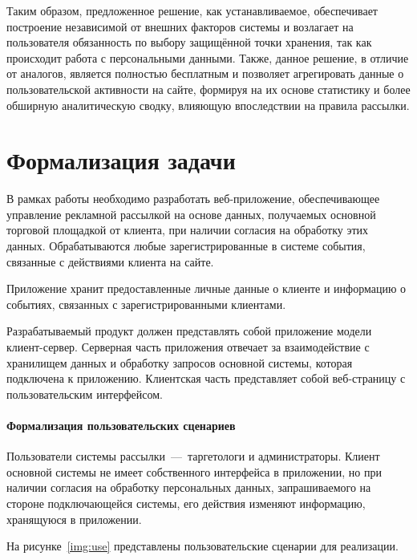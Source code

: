 Таким образом, предложенное решение, как устанавливаемое, обеспечивает построение независимой от внешних факторов системы и возлагает на пользователя обязанность по выбору защищённой точки хранения, так как происходит работа с персональными данными. Также, данное решение, в отличие от аналогов, является полностью бесплатным и позволяет агрегировать данные о пользовательской активности на сайте, формируя на их основе статистику и более обширную аналитическую сводку, влияющую впоследствии на правила рассылки.

\section{Формализация задачи}
В рамках работы необходимо разработать веб-приложение, обеспечивающее управление рекламной рассылкой на основе данных, получаемых основной торговой площадкой от клиента, при наличии согласия на обработку этих данных. Обрабатываются любые зарегистрированные в системе события, связанные с действиями клиента на сайте. 

Приложение хранит предоставленные личные данные о клиенте и информацию о событиях, связанных с зарегистрированными клиентами. 

Разрабатываемый продукт должен представлять собой приложение модели клиент-сер­вер. Серверная часть приложения отвечает за взаимодействие с хранилищем данных и обработку запросов основной системы, которая подключена к приложению. Клиентская часть представляет собой веб-страницу с пользовательским интерфейсом.

\paragraph{Формализация пользовательских сценариев}\mbox{}

Пользователи системы рассылки~---~таргетологи и администраторы. Клиент основной системы не имеет собственного интерфейса в приложении, но при наличии согласия на обработку персональных данных, запрашиваемого на стороне подключающейся системы, его действия изменяют информацию, хранящуюся в приложении.

На рисунке~\ref{img:use} представлены пользовательские сценарии для реализации.

\newpage

